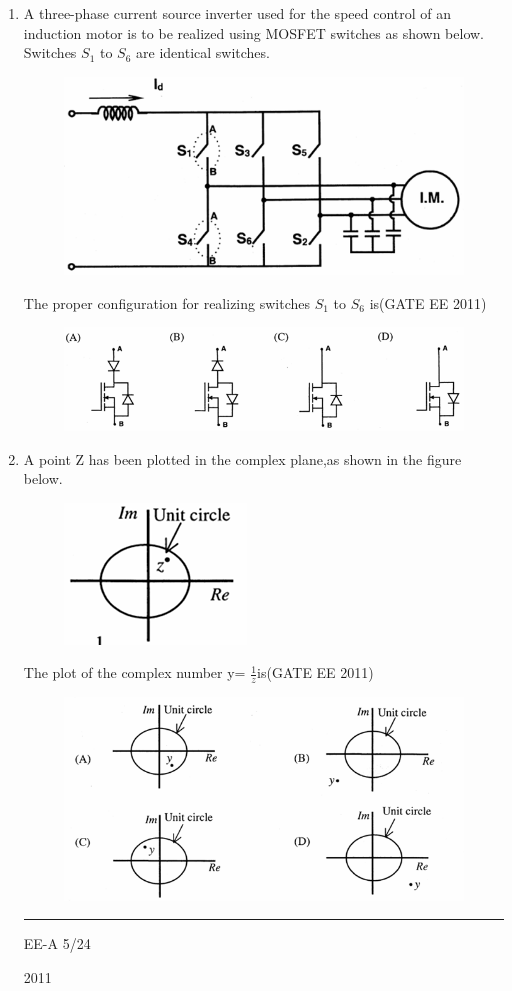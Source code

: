 \documentclass[a4paper,10pt]{exam}
\theoremstyle{remark}
\begin{document}
\begin{enumerate}
\noindent\rule{\textwidth}{0.4pt}
\item \hspace{0.3cm} A three-phase current source inverter used for the speed control of an induction motor is to be realized using MOSFET switches as shown below. Switches $S_{1}$ to $S_{6}$ are identical switches.

\begin{figure}[H]
    \centering
    \includegraphics[width=0.6\columnwidth]{figs/Q 13.png}\caption{}     \label{fig:myfigure}
\end{figure}
\raggedright{The proper configuration for realizing switches  $S_{1}$ to $S_{6}$ is}\hfill{(GATE EE 2011)}
\begin{figure}[H]
    \centering
    \includegraphics[width=0.75\columnwidth]{figs/Q 13 opt.png}
\end{figure}

\item A point Z has been plotted in the complex plane,as shown in the figure below.
\begin{figure}[H]
    \centering
    \includegraphics[width=0.2\columnwidth]{figs/Q 14.png}\caption{}     \label{fig:myfigure}
\end{figure}
The plot of the complex number y= $\frac{1}{z}$is\hfill{(GATE EE 2011)}
\begin{figure}[H]
    \centering
    \includegraphics[width=0.6\columnwidth]{figs/Q 14 opt.png}
\end{figure}
\noindent\rule{\textwidth}{0.4pt}
\raggedright{EE-A}
\hfill
5/24
\newpage
\raggedright{2011}
\hfill
{}\\


\end{enumerate}
\end{document}
